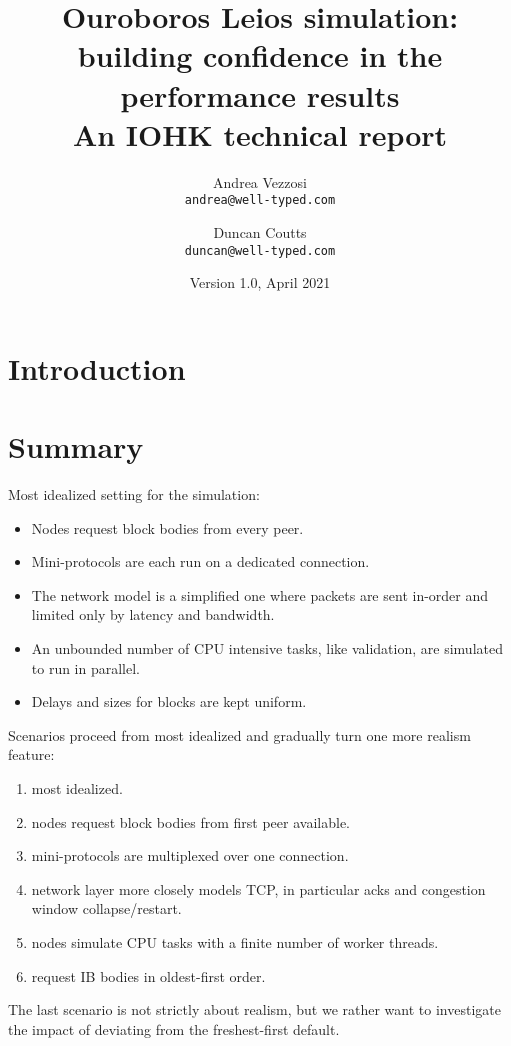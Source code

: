 \documentclass[11pt,a4paper]{article}
\begin{document}
\title{Ouroboros Leios simulation: \\
building confidence in the performance results \\
{\large \sc An IOHK technical report}
}
\date{Version 1.0, April 2021}
\author{Andrea Vezzosi     \\ {\small \texttt{andrea@well-typed.com}} \\
\and Duncan Coutts      \\ {\small \texttt{duncan@well-typed.com}}
}

\maketitle

\section{Introduction}
\label{introduction}


\tableofcontents

\listoftodos

\section{Summary}
\label{summary}

Most idealized setting for the simulation:
\begin{itemize}
    \item Nodes request block bodies from every peer.
    \item Mini-protocols are each run on a dedicated connection.
    \item The network model is a simplified one where packets are sent in-order and
          limited only by latency and bandwidth.
    \item An unbounded number of CPU intensive tasks, like validation, are simulated to run in parallel.
    \item Delays and sizes for blocks are kept uniform.
\end{itemize}

Scenarios proceed from most idealized and gradually turn one more realism feature:
\begin{enumerate}
    \item \label{sc:most-idealized} most idealized.
    \item \label{sc:request-from-first} nodes request block bodies from first peer available.
    \item \label{sc:multiplexing} mini-protocols are multiplexed over one connection.
    \item \label{sc:tcp} network layer more closely models TCP, in particular acks
          and congestion window collapse/restart.
    \item \label{sc:boundedcpu} nodes simulate CPU tasks with a finite number of worker threads.
    \item \label{sc:order} request IB bodies in oldest-first order.
\end{enumerate}
The last scenario is not strictly about realism, but we rather want to
investigate the impact of deviating from the freshest-first default.
\end{document}
